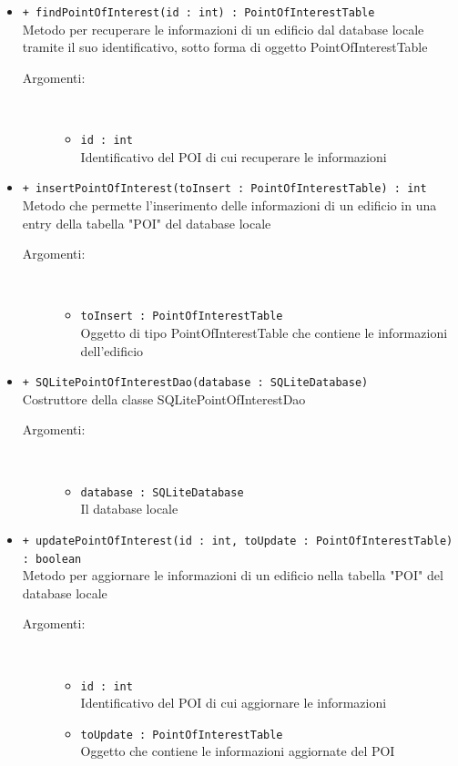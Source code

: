 \documentclass[../DefinizioneDiProdotto.tex]{subfiles}
\begin{document}
\begin{description}
\begin{itemize}
\begin{description}
\end{description}
\item \texttt{+ findPointOfInterest(id : int) : PointOfInterestTable}\\
Metodo per recuperare le informazioni di un edificio dal database locale tramite il suo identificativo, sotto forma di oggetto PointOfInterestTable
 \begin{description}
\item[Argomenti:] \
\begin{itemize}
\item \texttt{id : int}\\
Identificativo del POI di cui recuperare le informazioni\end{itemize}
\end{description}
\item \texttt{+ insertPointOfInterest(toInsert : PointOfInterestTable) : int}\\
Metodo che permette l'inserimento delle informazioni di un edificio in una entry della tabella "POI" del database locale
 \begin{description}
\item[Argomenti:] \
\begin{itemize}
\item \texttt{toInsert : PointOfInterestTable}\\
Oggetto di tipo PointOfInterestTable che contiene le informazioni dell'edificio\end{itemize}
\end{description}
\item \texttt{+ SQLitePointOfInterestDao(database : SQLiteDatabase)}\\
Costruttore della classe SQLitePointOfInterestDao
 \begin{description}
\item[Argomenti:] \
\begin{itemize}
\item \texttt{database : SQLiteDatabase}\\
Il database locale\end{itemize}
\end{description}
\item \texttt{+ updatePointOfInterest(id : int, toUpdate : PointOfInterestTable) : boolean}\\
Metodo per aggiornare le informazioni di un edificio nella tabella "POI" del database locale
 \begin{description}
\item[Argomenti:] \
\begin{itemize}
\item \texttt{id : int}\\
Identificativo del POI di cui aggiornare le informazioni\item \texttt{toUpdate : PointOfInterestTable}\\
Oggetto che contiene le informazioni aggiornate del POI\end{itemize}
\end{description}
\end{itemize}
\end{description}
\end{document}
